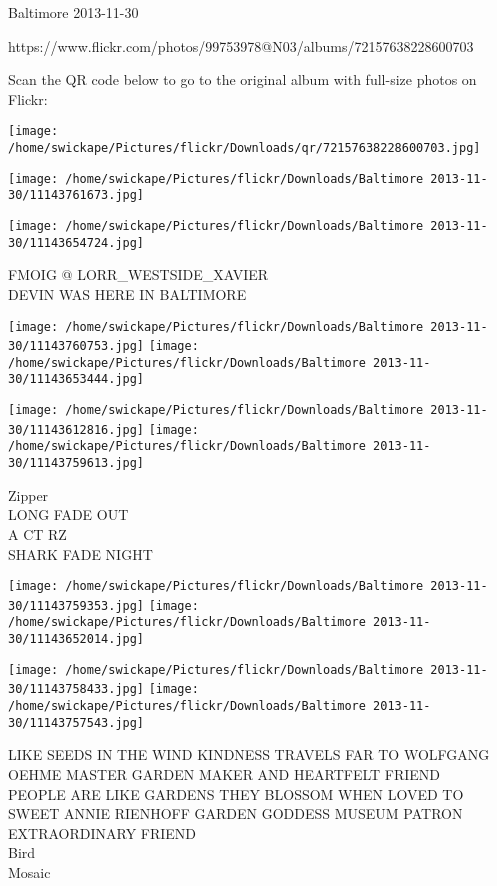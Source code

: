\documentclass[10pt,letterpaper]{article}
\begin{document}
Baltimore 2013-11-30

https://www.flickr.com/photos/99753978@N03/albums/72157638228600703

Scan the QR code below to go to the original album with full-size photos on Flickr:

\texttt{[image: /home/swickape/Pictures/flickr/Downloads/qr/72157638228600703.jpg]}
\pagebreak

\texttt{[image: /home/swickape/Pictures/flickr/Downloads/Baltimore 2013-11-30/11143761673.jpg]}

\vspace{0.25in}
\texttt{[image: /home/swickape/Pictures/flickr/Downloads/Baltimore 2013-11-30/11143654724.jpg]}

FMOIG @ LORR\_WESTSIDE\_XAVIER\\
DEVIN WAS HERE IN BALTIMORE
\pagebreak

\texttt{[image: /home/swickape/Pictures/flickr/Downloads/Baltimore 2013-11-30/11143760753.jpg]}
\texttt{[image: /home/swickape/Pictures/flickr/Downloads/Baltimore 2013-11-30/11143653444.jpg]}

\texttt{[image: /home/swickape/Pictures/flickr/Downloads/Baltimore 2013-11-30/11143612816.jpg]}
\texttt{[image: /home/swickape/Pictures/flickr/Downloads/Baltimore 2013-11-30/11143759613.jpg]}

Zipper\\
LONG FADE OUT\\
A CT RZ\\
SHARK FADE NIGHT
\pagebreak

\texttt{[image: /home/swickape/Pictures/flickr/Downloads/Baltimore 2013-11-30/11143759353.jpg]}
\texttt{[image: /home/swickape/Pictures/flickr/Downloads/Baltimore 2013-11-30/11143652014.jpg]}

\texttt{[image: /home/swickape/Pictures/flickr/Downloads/Baltimore 2013-11-30/11143758433.jpg]}
\texttt{[image: /home/swickape/Pictures/flickr/Downloads/Baltimore 2013-11-30/11143757543.jpg]}

LIKE SEEDS IN THE WIND KINDNESS TRAVELS FAR TO WOLFGANG OEHME MASTER GARDEN MAKER AND HEARTFELT FRIEND\\
PEOPLE ARE LIKE GARDENS THEY BLOSSOM WHEN LOVED TO SWEET ANNIE RIENHOFF GARDEN GODDESS MUSEUM PATRON EXTRAORDINARY FRIEND\\
Bird\\
Mosaic
\pagebreak
\end{document}
